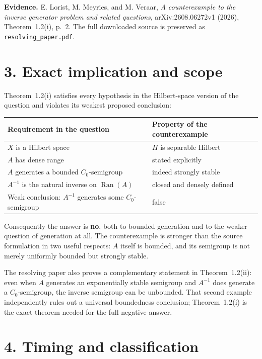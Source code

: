 \documentclass[11pt]{article}
\begin{document}
\small
\textbf{Evidence.} E. Lorist, M. Meyries, and M. Veraar, \emph{A
counterexample to the inverse generator problem and related questions},
arXiv:2608.06272v1 (2026), Theorem~1.2(i), p.~2.  The full downloaded source is
preserved as \texttt{resolving\_paper.pdf}.
\normalsize

\clearpage
\section*{3. Exact implication and scope}

Theorem~1.2(i) satisfies every hypothesis in the Hilbert-space version of the
question and violates its weakest proposed conclusion:

\begin{center}
\begin{tabular}{@{}ll@{}}
\toprule
Requirement in the question & Property of the counterexample \\
\midrule
$X$ is a Hilbert space & $H$ is separable Hilbert \\
$A$ has dense range & stated explicitly \\
$A$ generates a bounded $C_0$-semigroup & indeed strongly stable \\
$A^{-1}$ is the natural inverse on $\operatorname{Ran}(A)$ & closed and densely defined \\
Weak conclusion: $A^{-1}$ generates some $C_0$-semigroup & false \\
\bottomrule
\end{tabular}
\end{center}

Consequently the answer is \textbf{no}, both to bounded generation and to the
weaker question of generation at all.  The counterexample is stronger than the
source formulation in two useful respects: $A$ itself is bounded, and its
semigroup is not merely uniformly bounded but strongly stable.

The resolving paper also proves a complementary statement in
Theorem~1.2(ii): even when $A$ generates an exponentially stable semigroup and
$A^{-1}$ does generate a $C_0$-semigroup, the inverse semigroup can be
unbounded.  That second example independently rules out a universal boundedness
conclusion; Theorem~1.2(i) is the exact theorem needed for the full negative
answer.

\section*{4. Timing and classification}
\end{document}
